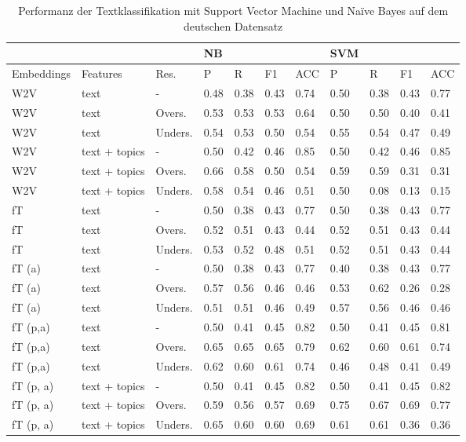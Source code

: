 \documentclass[ngerman]{ttlab-qualify}
\begin{document}
\newpage\begin{table}[!ht]
    \centering
    \caption{Performanz der Textklassifikation mit Support Vector Machine und Naïve Bayes auf dem deutschen Datensatz}
    \begin{tabular}{|l|l|l|l|l|l|l|l|l|l|l|}
    \hline
        \textbf{} & \textbf{} & \textbf{} & \textbf{NB} & \textbf{} & \textbf{} & \textbf{} & \textbf{SVM} & \textbf{} & \textbf{} & \textbf{} \\ \hline
        Embeddings & Features & Res. & P & R & F1 & ACC & P & R & F1 & ACC \\ \hline
        W2V  & text  &   - & 0.48 & 0.38 & 0.43 & 0.74 & 0.50 & 0.38 & 0.43 & 0.77 \\ \hline
        W2V  & text  & Overs. & 0.53 & 0.53 & 0.53 & 0.64 & 0.50 & 0.50 & 0.40 & 0.41 \\ \hline
        W2V  & text  & Unders. & 0.54 & 0.53 & 0.50 & 0.54 & 0.55 & 0.54 & 0.47 & 0.49 \\ \hline
        W2V  & text + topics &   - & 0.50 & 0.42 & 0.46 & 0.85 & 0.50 & 0.42 & 0.46 & 0.85 \\ \hline
        W2V  & text + topics & Overs. & 0.66 & 0.58 & 0.50 & 0.54 & 0.59 & 0.59 & 0.31 & 0.31 \\ \hline
        W2V   & text + topics & Unders. & 0.58 & 0.54 & 0.46 & 0.51 & 0.50 & 0.08 & 0.13 & 0.15 \\ \hline
        fT  & text  &   - & 0.50 & 0.38 & 0.43 & 0.77 & 0.50 & 0.38 & 0.43 & 0.77 \\ \hline
        fT  & text  & Overs. & 0.52 & 0.51 & 0.43 & 0.44 & 0.52 & 0.51 & 0.43 & 0.44 \\ \hline
        fT  & text  & Unders. & 0.53 & 0.52 & 0.48 & 0.51 & 0.52 & 0.51 & 0.43 & 0.44 \\ \hline
        fT (a) & text  &   - & 0.50 & 0.38 & 0.43 & 0.77 & 0.40 & 0.38 & 0.43 & 0.77 \\ \hline
        fT  (a) & text  & Overs. & 0.57 & 0.56 & 0.46 & 0.46 & 0.53 & 0.62 & 0.26 & 0.28 \\ \hline
        fT  (a) & text  & Unders. & 0.51 & 0.51 & 0.46 & 0.49 & 0.57 & 0.56 & 0.46 & 0.46 \\ \hline
        fT (p,a) & text  &   - & 0.50 & 0.41 & 0.45 & 0.82 & 0.50 & 0.41 & 0.45 & 0.81 \\ \hline
        fT (p,a) & text  & Overs. & 0.65 & 0.65 & 0.65 & 0.79 & 0.62 & 0.60 & 0.61 & 0.74 \\ \hline
        fT (p,a) & text  & Unders. & 0.62 & 0.60 & 0.61 & 0.74 & 0.46 & 0.48 & 0.41 & 0.49 \\ \hline
        fT (p, a) & text + topics &  - & 0.50 & 0.41 & 0.45 & 0.82 & 0.50 & 0.41 & 0.45 & 0.82 \\ \hline
        fT (p, a) & text + topics & Overs. & 0.59 & 0.56 & 0.57 & 0.69 & 0.75 & 0.67 & 0.69 & 0.77 \\ \hline
        fT (p, a) & text + topics & Unders. & 0.65 & 0.60 & 0.60 & 0.69 & 0.61 & 0.61 & 0.36 & 0.36 \\ \hline
    \end{tabular}
\end{table}
\end{document}
